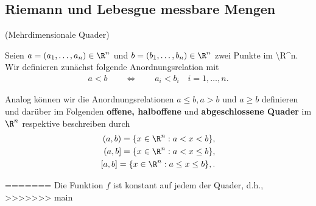 \documentclass[letterpaper,10pt,english]{jupyterBook}
\begin{document}
\subsection{Riemann  und Lebesgue messbare Mengen}
\begin{definition}{(Mehrdimensionale Quader)}{}\label{masstheorie/masstheorie:definition-6}



\par
Seien \(a = (a_1,\ldots,a_n) \in \R^n\) und \(b = (b_1,\ldots,b_n) \in \R^n\) zwei Punkte im \textbackslash{}R\textasciicircum{}n.
Wir definieren zunächst folgende Anordnungsrelation mit
\begin{align*}
a < b \qquad \Leftrightarrow \qquad a_i < b_i \quad i=1,\ldots,n.
\end{align*}
\par
Analog können wir die Anordnungsrelationen \(a \leq b, a > b\) und \(a \geq b\) definieren und darüber im Folgenden \textbf{offene, halboffene} und \textbf{abgeschlossene Quader} im \(\R^n\) respektive beschreiben durch
\begin{align*}
(a,b) = \lbrace x \in \R^n : a < x < b \rbrace,\\
(a,b] = \lbrace x \in \R^n : a < x \leq b \rbrace,\\
[a,b] = \lbrace x \in \R^n : a \leq x \leq b \rbrace,.
\end{align*}\end{definition}
=======
Die Funktion \(f\) ist konstant auf jedem der Quader, d.h.,
>>>>>>> main
\end{document}
